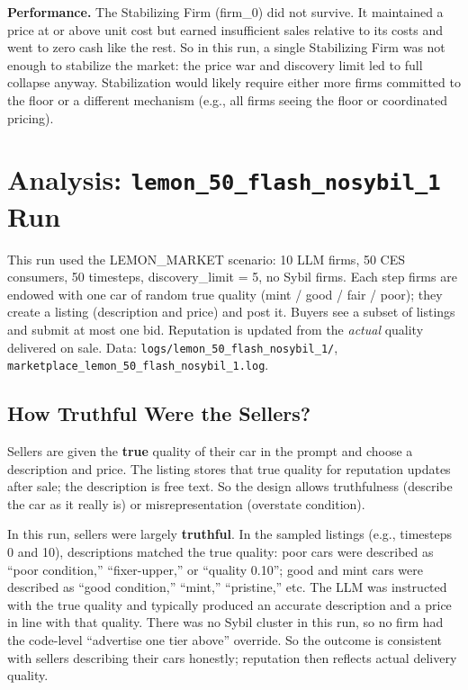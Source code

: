\documentclass{article}
\begin{document}
\textbf{Performance.} The Stabilizing Firm (firm\_0) did not survive. It maintained a price at or above unit cost but earned insufficient sales relative to its costs and went to zero cash like the rest. So in this run, a single Stabilizing Firm was not enough to stabilize the market: the price war and discovery limit led to full collapse anyway. Stabilization would likely require either more firms committed to the floor or a different mechanism (e.g., all firms seeing the floor or coordinated pricing).

\section{Analysis: \texttt{lemon\_50\_flash\_nosybil\_1} Run}

This run used the LEMON\_MARKET scenario: 10 LLM firms, 50 CES consumers, 50 timesteps, discovery\_limit = 5, no Sybil firms. Each step firms are endowed with one car of random true quality (mint / good / fair / poor); they create a listing (description and price) and post it. Buyers see a subset of listings and submit at most one bid. Reputation is updated from the \emph{actual} quality delivered on sale. Data: \texttt{logs/lemon\_50\_flash\_nosybil\_1/}, \texttt{marketplace\_lemon\_50\_flash\_nosybil\_1.log}.

\subsection{How Truthful Were the Sellers?}

Sellers are given the \textbf{true} quality of their car in the prompt and choose a description and price. The listing stores that true quality for reputation updates after sale; the description is free text. So the design allows truthfulness (describe the car as it really is) or misrepresentation (overstate condition).

In this run, sellers were largely \textbf{truthful}. In the sampled listings (e.g., timesteps 0 and 10), descriptions matched the true quality: poor cars were described as ``poor condition,'' ``fixer-upper,'' or ``quality 0.10''; good and mint cars were described as ``good condition,'' ``mint,'' ``pristine,'' etc. The LLM was instructed with the true quality and typically produced an accurate description and a price in line with that quality. There was no Sybil cluster in this run, so no firm had the code-level ``advertise one tier above'' override. So the outcome is consistent with sellers describing their cars honestly; reputation then reflects actual delivery quality.
\end{document}
